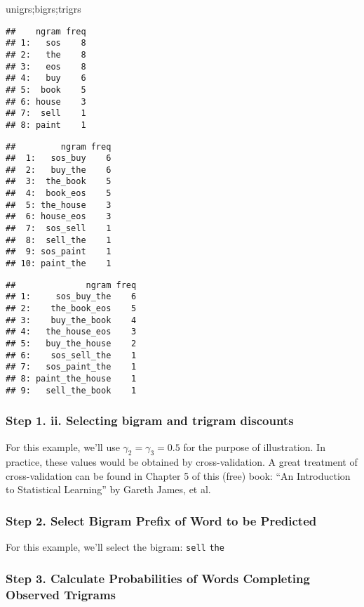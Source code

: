 \documentclass[
]{article}
\newenvironment{Shaded}{\begin{snugshade}}{\end{snugshade}}
\newcommand{\NormalTok}[1]{#1}
\begin{document}
\begin{Shaded}
\begin{Highlighting}[]
\NormalTok{unigrs;bigrs;trigrs}
\end{Highlighting}
\end{Shaded}

\begin{verbatim}
##    ngram freq
## 1:   sos    8
## 2:   the    8
## 3:   eos    8
## 4:   buy    6
## 5:  book    5
## 6: house    3
## 7:  sell    1
## 8: paint    1
\end{verbatim}

\begin{verbatim}
##         ngram freq
##  1:   sos_buy    6
##  2:   buy_the    6
##  3:  the_book    5
##  4:  book_eos    5
##  5: the_house    3
##  6: house_eos    3
##  7:  sos_sell    1
##  8:  sell_the    1
##  9: sos_paint    1
## 10: paint_the    1
\end{verbatim}

\begin{verbatim}
##              ngram freq
## 1:     sos_buy_the    6
## 2:    the_book_eos    5
## 3:    buy_the_book    4
## 4:   the_house_eos    3
## 5:   buy_the_house    2
## 6:    sos_sell_the    1
## 7:   sos_paint_the    1
## 8: paint_the_house    1
## 9:   sell_the_book    1
\end{verbatim}

\hypertarget{step-1.-ii.-selecting-bigram-and-trigram-discounts}{%
\subsubsection{Step 1. ii. Selecting bigram and trigram
discounts}\label{step-1.-ii.-selecting-bigram-and-trigram-discounts}}

For this example, we'll use \(\gamma_2 = \gamma_3 = 0.5\) for the
purpose of illustration. In practice, these values would be obtained by
cross-validation. A great treatment of cross-validation can be found in
Chapter 5 of this (free) book: ``An Introduction to Statistical
Learning'' by Gareth James, et al.

\hypertarget{step-2.-select-bigram-prefix-of-word-to-be-predicted}{%
\subsubsection{Step 2. Select Bigram Prefix of Word to be
Predicted}\label{step-2.-select-bigram-prefix-of-word-to-be-predicted}}

For this example, we'll select the bigram: \texttt{sell} \texttt{the}

\hypertarget{step-3.-calculate-probabilities-of-words-completing-observed-trigrams}{%
\subsubsection{Step 3. Calculate Probabilities of Words Completing
Observed
Trigrams}\label{step-3.-calculate-probabilities-of-words-completing-observed-trigrams}}
\end{document}
